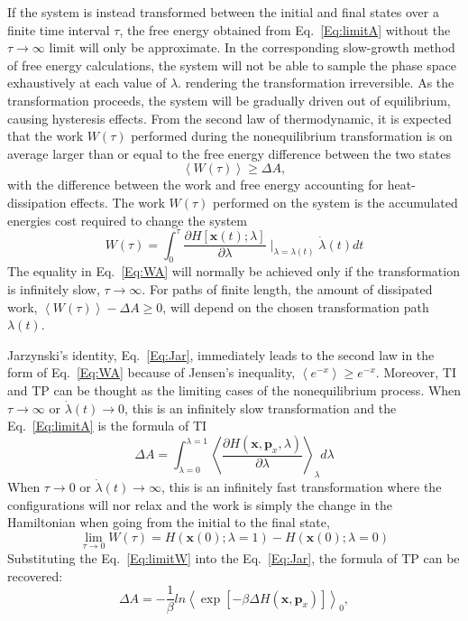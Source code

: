 If the system is instead transformed between the initial and final states over a finite time interval $\tau$, the free energy obtained from Eq.~\ref{Eq:limitA} without the $\tau\to\infty$ limit will only be approximate. In the corresponding slow-growth method of free energy calculations, the system will not be able to sample the phase space exhaustively at each value of $\lambda$. rendering the transformation irreversible. As the transformation proceeds, the system will be gradually driven out of equilibrium, causing hysteresis effects. From the second law of thermodynamic, it is expected that the work $W(\tau)$ performed during the nonequilibrium transformation is on average larger than or equal to the free energy difference between the two states
\begin{equation}
\left \langle W(\tau) \right \rangle \ge \Delta A,
\label{Eq:WA}
\end{equation} 
with the difference between the work and free energy accounting for heat-dissipation effects. The work $W(\tau)$ performed on the system is the accumulated energies cost required to change the system
\begin{equation}
W(\tau) = \int_{0}^{\tau} \frac{\partial{H[\textbf{x}(t);\lambda]}}{\partial{\lambda}}\mid_ {\lambda=\lambda(t)} \dot{\lambda}(t) dt
\label{Eq:work}
\end{equation}    
The equality in Eq.~\ref{Eq:WA} will normally be achieved only if the transformation is infinitely slow, $\tau\to\infty$.  For paths of finite length, the amount of dissipated work, $\left \langle W(\tau) \right \rangle - \Delta A \ge 0$, will depend on the chosen transformation path $\lambda(t)$.

Jarzynski's identity, Eq.~\ref{Eq:Jar}, immediately leads to the second law in the form of Eq.~\ref{Eq:WA} because of Jensen's inequality, $\left \langle e^{-x} \right \rangle \ge e^{-x} $.
Moreover, TI and TP can be thought as the limiting cases of the nonequilibrium process. When $\tau\to\infty$ or $\dot{\lambda}(t)\to0$, this is an infinitely slow transformation and the Eq.~\ref{Eq:limitA} is the formula of TI
\begin{equation}
\Delta A = \int_{\lambda=0}^{\lambda=1}\left \langle \frac{\partial{H(\textbf{x},\textbf{p}_{x},\lambda)}}{\partial{\lambda}} \right \rangle_{\lambda} d\lambda
\label{Eq:TINEW}
\end{equation}  
When $\tau\to0$ or $\dot{\lambda}(t)\to\infty$, this is an infinitely fast transformation where the configurations will nor relax and the work is simply the change in the Hamiltonian when going from the initial to the final state,
\begin{equation}
\lim_{\tau\to0}W(\tau) = H(\textbf{x}(0);\lambda=1)-H(\textbf{x}(0);\lambda=0)
\label{Eq:limitW}
\end{equation}
Substituting the Eq.~\ref{Eq:limitW} into the Eq.~\ref{Eq:Jar}, the formula of TP can be recovered:
\begin{equation}
\Delta A = -\frac{1}{\beta} ln \left \langle \exp[-\beta \Delta H(\textbf{x},\textbf{p}_{x})] \right \rangle  _{0},
\label{Eq:deltaA4NEW}
\end{equation}

